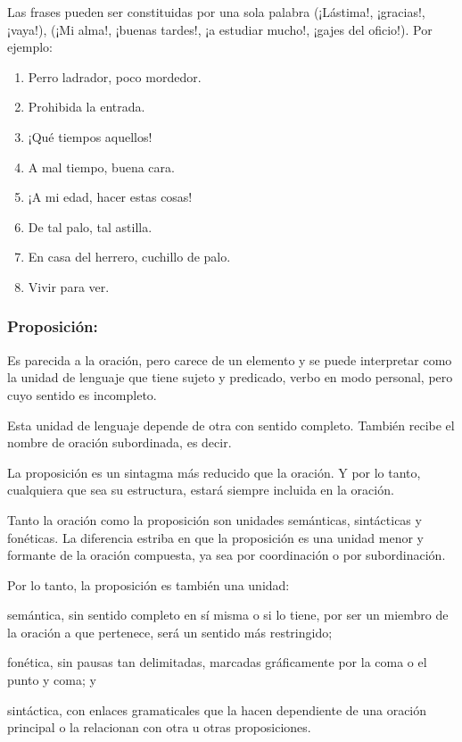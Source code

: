 Las frases pueden ser constituidas por una sola palabra (¡Lástima!,
¡gracias!, ¡vaya!), (¡Mi alma!, ¡buenas tardes!, ¡a estudiar mucho!,
¡gajes del oficio!). Por ejemplo:

\begin{ejems}{}\begin{enumerate}

\item Perro ladrador, poco mordedor. 

\item Prohibida la entrada. 

\item ¡Qué tiempos aquellos! 

\item A mal tiempo, buena cara. 

\item ¡A mi edad, hacer estas cosas! 

\item De tal palo, tal astilla. 

\item En casa del herrero, cuchillo de palo. 

\item Vivir para ver.\end{enumerate}\end{ejems}


\subsubsection{Proposición: }

Es parecida a la oración, pero carece de un elemento y se puede interpretar
como la unidad de lenguaje que tiene sujeto y predicado, verbo en
modo personal, pero cuyo sentido es incompleto. 

Esta unidad de lenguaje depende de otra con sentido completo. También
recibe el nombre de oración subordinada, es decir.

La proposición es un sintagma más reducido que la oración. Y por lo
tanto, cualquiera que sea su estructura, estará siempre incluida en
la oración.

Tanto la oración como la proposición son unidades semánticas, sintácticas
y fonéticas. La diferencia estriba en que la proposición es una unidad
menor y formante de la oración compuesta, ya sea por coordinación
o por subordinación.

Por lo tanto, la proposición es también una unidad:

\begin{lista} 

\item semántica, sin sentido completo en sí misma o si lo tiene,
por ser un miembro de la oración a que pertenece, será un sentido
más restringido;

\item fonética, sin pausas tan delimitadas, marcadas gráficamente
por la coma o el punto y coma; y \item sintáctica, con enlaces gramaticales
que la hacen dependiente de una oración principal o la relacionan
con otra u otras proposiciones.

\end{lista}

